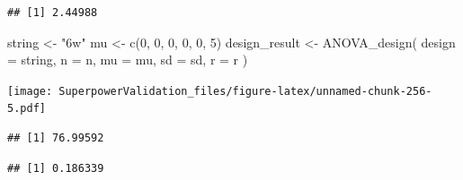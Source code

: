 \documentclass[
]{book}
\newenvironment{Shaded}{\begin{snugshade}}{\end{snugshade}}
\newcommand{\AttributeTok}[1]{\textcolor[rgb]{0.77,0.63,0.00}{#1}}
\newcommand{\DecValTok}[1]{\textcolor[rgb]{0.00,0.00,0.81}{#1}}
\newcommand{\FunctionTok}[1]{\textcolor[rgb]{0.00,0.00,0.00}{#1}}
\newcommand{\NormalTok}[1]{#1}
\newcommand{\OtherTok}[1]{\textcolor[rgb]{0.56,0.35,0.01}{#1}}
\newcommand{\SpecialCharTok}[1]{\textcolor[rgb]{0.00,0.00,0.00}{#1}}
\newcommand{\StringTok}[1]{\textcolor[rgb]{0.31,0.60,0.02}{#1}}
\begin{document}
\begin{verbatim}
## [1] 2.44988
\end{verbatim}

\begin{Shaded}
\begin{Highlighting}[]
\NormalTok{string }\OtherTok{\textless{}{-}} \StringTok{"6w"}
\NormalTok{mu }\OtherTok{\textless{}{-}} \FunctionTok{c}\NormalTok{(}\DecValTok{0}\NormalTok{, }\DecValTok{0}\NormalTok{, }\DecValTok{0}\NormalTok{, }\DecValTok{0}\NormalTok{, }\DecValTok{0}\NormalTok{, }\DecValTok{5}\NormalTok{) }
\NormalTok{design\_result }\OtherTok{\textless{}{-}} \FunctionTok{ANOVA\_design}\NormalTok{(}
  \AttributeTok{design =}\NormalTok{ string,}
  \AttributeTok{n =}\NormalTok{ n,}
  \AttributeTok{mu =}\NormalTok{ mu,}
  \AttributeTok{sd =}\NormalTok{ sd,}
  \AttributeTok{r =}\NormalTok{ r}
\NormalTok{)}
\end{Highlighting}
\end{Shaded}

\texttt{[image: SuperpowerValidation\_files/figure-latex/unnamed-chunk-256-5.pdf]}

\begin{Shaded}
\end{Shaded}

\begin{verbatim}
## [1] 76.99592
\end{verbatim}

\begin{Shaded}
\end{Shaded}

\begin{verbatim}
## [1] 0.186339
\end{verbatim}

\begin{Shaded}
\end{Shaded}
\end{document}
